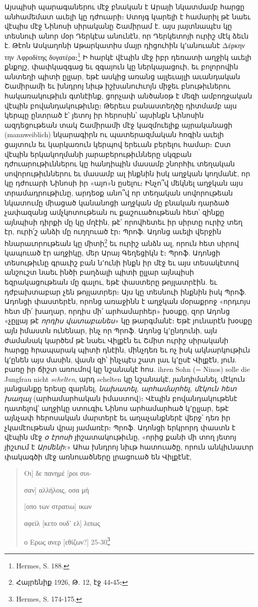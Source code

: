 \documentclass{article}
\begin{document}
{Այսպիսի պարագաներու մէջ բնական է Արայի նկատմամբ հարցը անհամեմատ աւելի կը դժուարի։ Ստոյգ կարելի է համարիլ թէ նաեւ վէպիս մէջ Նինոսի սիրականը Շամիրամ է. այս յայտնապէս կը տեսնուի անոր մօր Դերկէա անունէն, որ Դերկետոյի ուրիշ մէկ ձեւն է. Թէոն Ասկաղոնի Աթարկատիս մայր դիցուհին կ՚անուանէ Δέρκην την Αφροδίτης δυγατέρα։\footnote{Hermes, S. 188.} Ի հարկէ վէպին մէջ իբր դեռատի աղջիկ աւելի քնքոյշ, փափկազգաց եւ զգայուն կը ներկայացուի, եւ բոլորովին անտեղի պիտի ըլլար, եթէ ասկից առանց այլեւայլի աւանդական Շամիրամի եւ խնդրոյ նիւթ իշխանուհւոյն միջեւ բնութիւներու հակառակութիւն գտնէինք, ցորչափ անծանօթ է մեզի ամբողջական վէպին բովանդակութիւնը։ Թերեւս բանաստեղծը դիտմամբ այս կերպը ընտրած է՝ յետոյ իր հերոսին՝ այսինքն Նինոսին ազդեցութեան տակ Շամիրամի մէջ կազմուելիք այրականացի (mannweiblich) նկարագիրն ու պատերազմական հոգին աւելի ցայտուն եւ կարկառուն կերպով երեւան բերելու համար։ Ըստ վէպին երկակողմանի յարաբերութիւնները սկզբան դժուարութիւններու կը հանդիպին մասամբ շնորհիւ տեղական սովորութիւններու եւ մասամբ ալ ինքնին իսկ աղջկան կողմանէ, որ կը դժուարի Նինոսի իր «այո»ն ըսելու։ Ինչո՞վ մեկնել աղջկան այս տրամադրութիւնը, արդեօք անո՞վ որ տեղական սովորութեան նկատումը միացած կանանոցի աղջկան մը բնական դարձած չափազանց ամչկոտութեան ու քաշուածութեան հետ՝ զինքը այնպիսի դիրքի մը կը մղէին, թէ՝ որովհետեւ իր սիրտը ուրիշ տեղ էր, ուրի՛շ անձի մը ուղղուած էր։ Պրոֆ. Ադոնց աւելի վերջին հնարաւորութեան կը միտի\footnote{Հայրենիք 1926, Թ. 12, էջ 44֊45։} եւ ուրիշ անձն ալ, որուն հետ սիրով կապուած էր աղջիկը, մեր Արայ Գեղեցիկն է։ Պրոֆ. Ադոնցի տեսութիւնը գրաւիշ բան ն՚ունի ինքն իր մէջ եւ այս տեսակէտով անշուշտ նաեւ ինծի բաղձալի պիտի ըլլար այնպիսի եզրակացութեան մը գալու, եթէ փաստերը թոյլատրէին. եւ դժբախտաբար չեն թոյլատրեր։ Այս կը տեսնուի ինքնին իսկ Պրոֆ. Ադոնցի փաստերէն, որոնց առաջինն է աղջկան մօրաքրոջ «որդւոյս հետ մի՛ խաղար, որդիս մի՛ արհամարհեր» խօսքը, զոր Ադոնց «չըլլայ թէ \emph{որդիս վատաբանես}» կը թարգմանէ։ Եթէ յունարէն խօսքը այն իմաստն ունենար, ինչ որ Պրոֆ. Ադոնց կ՚ընդունի, այն ժամանակ կարծեմ թէ նաեւ Վիլքէն եւ Շմիտ ուրիշ սիրականի հարցը հրապարակ պիտի դնէին, մինչդեռ եւ ոչ իսկ ակնարկութիւն կ՚ընեն այս մասին, վասն զի՝ ինչպէս շատ լաւ կ՚ըսէ Վիլքէն, յուն. բառը իր ճիշտ առումով կը նշանակէ հոս. ihren Sohn (= Ninos) solle die Jungfrau nicht \emph{schelten}, արդ schelten կը նշանակէ, յանդիմանել, մէկուն յանցանքը երեսը զարնել, \emph{նախատել, արհամարհել, մէկուն հետ խաղալ} (արհամարհական իմաստով)։ Վէպին բովանդակութենէ դատելով՝ աղջիկը ստուգիւ Նինոս արհամարհած կ՚ըլլար, եթէ այնչափ հերոսական մարտերէ եւ աղաչանքներէ վերջ՝ դեռ իր չկամէութեան վրայ յամառէր։ Պրոֆ. Ադոնցի երկրորդ փաստն է վէպին մէջ \emph{օ էրոսի} յիշատակութիւնը, «որից քանի մի տող յետոյ յիշւում է \emph{Արմենի}։» Ահա խնդրոյ նիւթ հատուածը, որուն անկիւնաւոր փակագծի մէջ առնուածները լրացուած են Վիլքէնէ,}
\begin{quotation}
\small
Οι] δε πανημέ [ροι συι-

σαν] αλλήλοις, οσα μή

[οπο των στρατιω] ικων

αφείλ [κετο ουδ' ελ] λιπως

ο Ερως ανερ [εθίζων?]  25-30\footnote{Hermes, S. 174-175.}
\end{quotation}
\end{document}
